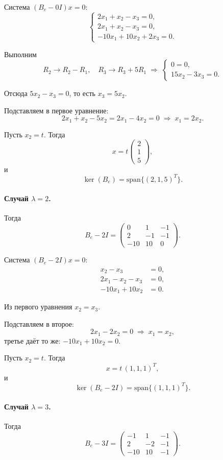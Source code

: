 \documentclass[12pt]{article}
\begin{document}
Система \((B_e - 0I)x=0\):
\[
	\begin{cases}
		2x_1 + x_2 - x_3 = 0, \\
		2x_1 + x_2 - x_3 = 0, \\
		-10x_1 + 10x_2 + 2x_3 = 0.
	\end{cases}
\]

Выполним
\[
	R_2 \to R_2 - R_1,\quad
	R_3 \to R_3 + 5R_1
	\;\Longrightarrow\;
	\begin{cases}
		0 = 0, \\
		15x_2 - 3x_3 = 0.
	\end{cases}
\]

Отсюда \(5x_2 - x_3 = 0\), то есть \(x_3 = 5x_2\).

Подставляем в первое уравнение:
\[
	2x_1 + x_2 - 5x_2 = 2x_1 - 4x_2 = 0
	\;\Longrightarrow\;
	x_1 = 2x_2.
\]

Пусть \(x_2 = t\). Тогда
\[
	x = t
	\begin{pmatrix}
		2 \\1\\5
	\end{pmatrix},
\]
и
\[
	\ker(B_e) = \mathrm{span}\{(2,1,5)^T\}.
\]

\paragraph*{Случай \(\lambda=2\).}

Тогда
\[
	B_e - 2I =
	\begin{pmatrix}
		0   & 1  & -1 \\
		2   & -1 & -1 \\
		-10 & 10 & 0
	\end{pmatrix}.
\]

Система \((B_e - 2I)x=0\):
\[
	\begin{aligned}
		x_2 - x_3        & = 0, \\
		2x_1 - x_2 - x_3 & = 0, \\
		-10x_1 + 10x_2   & = 0.
	\end{aligned}
\]

Из первого уравнения \(x_2 = x_3\).

Подставляем в второе:
\[
	2x_1 - 2x_2 = 0
	\;\Longrightarrow\;
	x_1 = x_2,
\]
третье даёт то же: \(-10x_1+10x_2=0\).

Пусть \(x_2 = t\). Тогда
\[
	x = t\,(1,1,1)^T,
\]
и
\[
	\ker(B_e - 2I) = \mathrm{span}\{(1,1,1)^T\}.
\]

\paragraph*{Случай \(\lambda=3\).}
Тогда
\[
	B_e - 3I =
	\begin{pmatrix}
		-1  & 1  & -1 \\
		2   & -2 & -1 \\
		-10 & 10 & -1
	\end{pmatrix}.
\]
\end{document}
